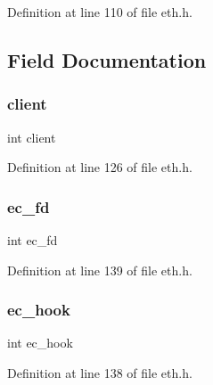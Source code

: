 Definition at line 110 of file eth.\+h.



\subsection{Field Documentation}
\hypertarget{structeth__card_a4bf947cca001e8ca0cd9def2b8d058c7}{}\label{structeth__card_a4bf947cca001e8ca0cd9def2b8d058c7} 
\subsubsection{\texorpdfstring{client}{client}}
{\footnotesize\ttfamily int client}



Definition at line 126 of file eth.\+h.

\hypertarget{structeth__card_abe4828b25f36af9f6d8dcf2a71507243}{}\label{structeth__card_abe4828b25f36af9f6d8dcf2a71507243} 
\subsubsection{\texorpdfstring{ec\+\_\+fd}{ec\_fd}}
{\footnotesize\ttfamily int ec\+\_\+fd}



Definition at line 139 of file eth.\+h.

\hypertarget{structeth__card_a32bb72dc9332542f9924c1b5742d5f75}{}\label{structeth__card_a32bb72dc9332542f9924c1b5742d5f75} 
\subsubsection{\texorpdfstring{ec\+\_\+hook}{ec\_hook}}
{\footnotesize\ttfamily int ec\+\_\+hook}



Definition at line 138 of file eth.\+h.

\hypertarget{structeth__card_a8ad1572edf76bc1a36efce44d02998c7}{}\label{structeth__card_a8ad1572edf76bc1a36efce44d02998c7} 
